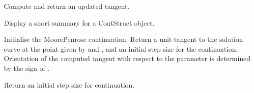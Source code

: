 \documentclass[a4paper,11pt,english]{sphinxmanual}
\begin{document}
\begin{fulllineitems}
\begin{fulllineitems}
\label{\detokenize{python/cmdref_ContStruct:getfem.ContStruct.compute_tangent}}
Compute and return an updated tangent.

\end{fulllineitems}


\begin{fulllineitems}
\label{\detokenize{python/cmdref_ContStruct:getfem.ContStruct.display}}
Display a short summary for a ContStruct object.

\end{fulllineitems}


\begin{fulllineitems}
\label{\detokenize{python/cmdref_ContStruct:getfem.ContStruct.init_Moore_Penrose_continuation}}
Initialise the Moore\sphinxhyphen{}Penrose continuation: Return a unit tangent to
the solution curve at the point given by  and ,
and an initial step size for the continuation. Orientation of the
computed tangent with respect to the parameter is determined by the
sign of .

\end{fulllineitems}


\begin{fulllineitems}
\label{\detokenize{python/cmdref_ContStruct:getfem.ContStruct.init_step_size}}
Return an initial step size for continuation.

\end{fulllineitems}


\end{fulllineitems}
\end{document}
